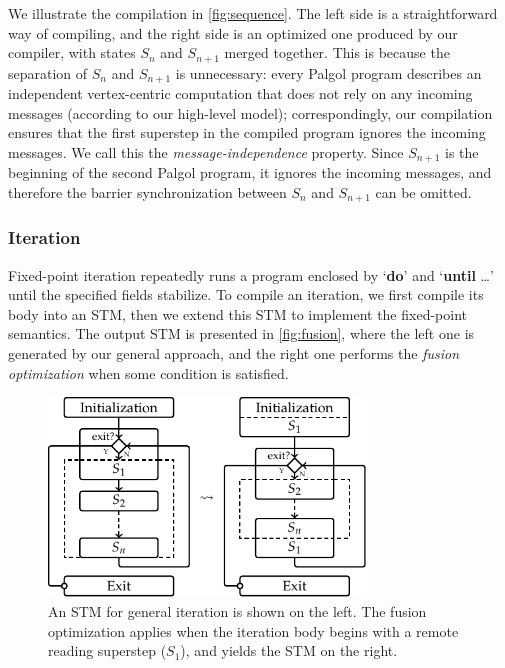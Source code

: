 \documentclass{sokendai_thesis} %
\begin{document}
We illustrate the compilation in \autoref{fig:sequence}.
The left side is a straightforward way of compiling, and the right side is an optimized one produced by our compiler, with states $S_n$ and $S_{n+1}$ merged together.
This is because the separation of $S_n$ and $S_{n+1}$ is unnecessary:
every Palgol program describes an independent vertex-centric computation that does not rely on any incoming messages (according to our high-level model); correspondingly, our compilation ensures that the first superstep in the compiled program ignores the incoming messages.
We call this the \emph{message-independence} property.
Since $S_{n+1}$ is the beginning of the second Palgol program, it ignores the incoming messages, and therefore the barrier synchronization between $S_n$ and $S_{n+1}$ can be omitted.

\subsubsection{Iteration}

Fixed-point iteration repeatedly runs a program enclosed by `\textbf{do}' and `\textbf{until} \ldots' until the specified fields stabilize.
To compile an iteration, we first compile its body into an STM, then we extend this STM to implement the fixed-point semantics.
The output STM is presented in \autoref{fig:fusion}, where the left one is generated by our general approach, and the right one performs the \emph{fusion optimization} when some condition is satisfied.

\begin{figure}[h]
 \centering
 \includegraphics[width=0.75\textwidth]{figures/stm-opt.pdf}
 \caption{An STM for general iteration is shown on the left. The fusion optimization applies when the iteration body begins with a remote reading superstep ($S_1$), and yields the STM on the right.}
 \label{fig:fusion}
\vspace{-2ex}\end{figure}
\end{document}
